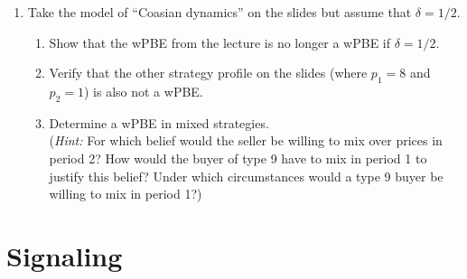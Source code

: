 \documentclass[a4paper,12pt]{article}
\begin{document}
\begin{enumerate}[resume]
\item Take the model of ``Coasian dynamics'' on the slides but assume that $\delta=1/2$.
  \begin{enumerate}
  \item Show that the wPBE from the lecture is no longer a wPBE if $\delta=1/2$.
  \item Verify that the other strategy profile on the slides (where $p_1=8$ and $p_2=1$) is also not a wPBE.
  \item Determine a wPBE in mixed strategies.\\
    (\emph{Hint:} For which belief would the seller be willing to mix over prices in period 2? How would the buyer of type 9 have to mix in period 1 to justify this belief? Under which circumstances would a type 9 buyer be willing to mix in period 1?)
  \end{enumerate}
\end{enumerate}

\section{Signaling}
\label{sec:signaling}
\end{document}
